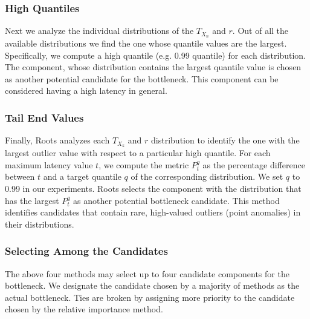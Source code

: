 \subsubsection{High Quantiles}
\label{sec:highquantile}
Next we analyze the individual distributions of the $T_{X_n}$ and $r$. 
Out of all the available distributions
we find the one whose quantile values are the largest.
Specifically, we compute a high
quantile (e.g. 0.99 quantile) for each distribution. The component, whose distribution 
contains the largest quantile value
is chosen as another potential candidate for the bottleneck. This component can be considered
having a high latency in general.

\subsubsection{Tail End Values}
\label{sec:tailend}
Finally, Roots analyzes each $T_{X_k}$ and $r$ distribution to identify the one 
with the largest outlier value with respect to a particular high quantile.
For each maximum latency value $t$, we compute the metric $P^q_t$ 
as the percentage difference between $t$ and a target quantile
$q$ of the corresponding distribution. We set $q$ to 0.99 in our experiments.
Roots selects the component with the 
distribution that has the largest $P^q_t$ as another potential bottleneck candidate.
This method identifies
candidates that contain rare, high-valued outliers (point anomalies) in their distributions.

\subsubsection{Selecting Among the Candidates}
The above four methods may select up to four candidate components for the bottleneck. 
We designate 
the candidate chosen by a majority of methods as the actual bottleneck. Ties
are broken by assigning more priority to the candidate chosen by the relative importance
method.
